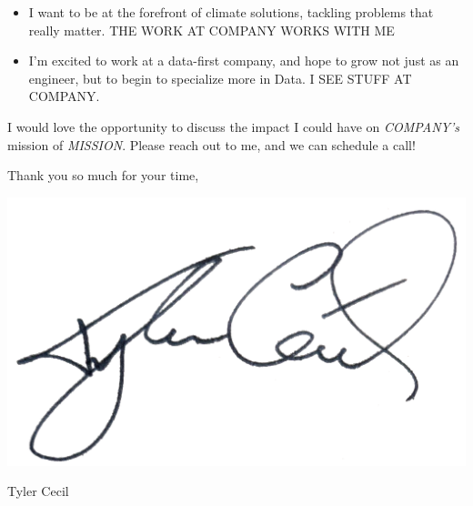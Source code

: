 \documentclass[sans, a4paper, 11pt]{article}
\begin{document}
\begin{adjustwidth}{40pt}{40pt}
\begin{itemize}
    \item I want to be at the forefront of climate solutions, tackling problems
      that really matter. THE WORK AT COMPANY WORKS WITH ME

    \item I'm excited to work at a data-first company, and hope to grow not
      just as an engineer, but to begin to specialize more in Data. I SEE STUFF
      AT COMPANY.
  \end{itemize} \medskip


  I would love the opportunity to discuss the impact I could have on
  \emph{COMPANY's} mission of \emph{MISSION}. Please reach out to me, and we
  can schedule a call!  \bigskip

  \begin{minipage}{0.5\linewidth}
    Thank you so much for your time,
    \vspace{1em}
  \end{minipage}
  \begin{minipage}{0.5\linewidth}
    \vspace{-1em}
    \hfill\includegraphics[height=4.5\baselineskip]{sig}

    \vspace{-2em}
    \hfill Tyler Cecil
  \end{minipage}

\end{adjustwidth}
\end{document}

